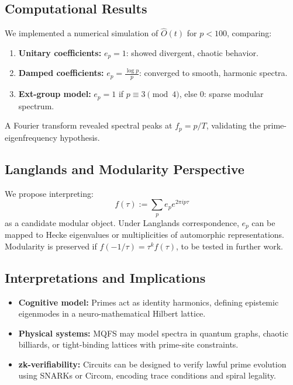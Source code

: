 \documentclass[12]{amsart}
\theoremstyle{plain}
\begin{document}
\subsection{Computational Results}

We implemented a numerical simulation of \( \hat{O}(t) \) for \( p < 100 \), comparing:

\begin{enumerate}
    \item \textbf{Unitary coefficients:} \( e_p = 1 \): showed divergent, chaotic behavior.
    \item \textbf{Damped coefficients:} \( e_p = \frac{\log p}{p} \): converged to smooth, harmonic spectra.
    \item \textbf{Ext-group model:} \( e_p = 1 \) if \( p \equiv 3 \pmod{4} \), else 0: sparse modular spectrum.
\end{enumerate}

A Fourier transform revealed spectral peaks at \( f_p = p / T \), validating the prime-eigenfrequency hypothesis.

\subsection{Langlands and Modularity Perspective}

We propose interpreting:
\[
f(\tau) := \sum_{p} e_p e^{2\pi i p \tau}
\]
as a candidate modular object. Under Langlands correspondence, \( e_p \) can be mapped to Hecke eigenvalues or multiplicities of automorphic representations. Modularity is preserved if \( f(-1/\tau) = \tau^k f(\tau) \), to be tested in further work.

\subsection{Interpretations and Implications}

\begin{itemize}
    \item \textbf{Cognitive model:} Primes act as identity harmonics, defining epistemic eigenmodes in a neuro-mathematical Hilbert lattice.
    \item \textbf{Physical systems:} MQFS may model spectra in quantum graphs, chaotic billiards, or tight-binding lattices with prime-site constraints.
    \item \textbf{zk-verifiability:} Circuits can be designed to verify lawful prime evolution using SNARKs or Circom, encoding trace conditions and spiral legality.
\end{itemize}
\end{document}
